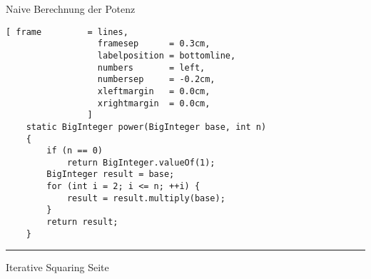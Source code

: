 \documentclass{slides}
\newcounter{mypage}
\begin{document}
\begin{slide}{}
\begin{center}
Naive Berechnung der Potenz 
\end{center}

\footnotesize

\begin{Verbatim}[ frame         = lines, 
                  framesep      = 0.3cm, 
                  labelposition = bottomline,
                  numbers       = left,
                  numbersep     = -0.2cm,
                  xleftmargin   = 0.0cm,
                  xrightmargin  = 0.0cm,
                ]
    static BigInteger power(BigInteger base, int n)
    {
        if (n == 0) 
            return BigInteger.valueOf(1);
        BigInteger result = base;
        for (int i = 2; i <= n; ++i) {
            result = result.multiply(base);
        }
        return result;
    }
\end{Verbatim}

\vspace*{\fill}
\tiny \addtocounter{mypage}{1}
\rule{17cm}{1mm}
Iterative Squaring \hspace*{\fill} Seite 
\end{slide}

\end{document}
